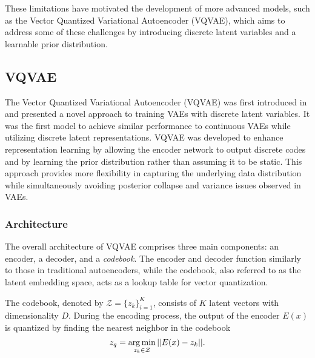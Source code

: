 \documentclass[../../thesis.tex]{subfiles}
\begin{document}
These limitations have motivated the development of more advanced models, such as the Vector Quantized Variational Autoencoder (VQVAE), which aims to address some of these challenges by introducing discrete latent variables and a learnable prior distribution.


\subsection{VQVAE}
The Vector Quantized Variational Autoencoder (VQVAE) was first introduced in \cite{VQVAE} and presented a novel approach to training VAEs with discrete latent variables. It was the first model to achieve similar performance to continuous VAEs while utilizing discrete latent representations. VQVAE was developed to enhance representation learning by allowing the encoder network to output discrete codes and by learning the prior distribution rather than assuming it to be static. This approach provides more flexibility in capturing the underlying data distribution while simultaneously avoiding posterior collapse and variance issues observed in VAEs.



\subsubsection{Architecture}

The overall architecture of VQVAE comprises three main components: an encoder, a decoder, and a \textit{codebook}. The encoder and decoder function similarly to those in traditional autoencoders, while the codebook, also referred to as the latent embedding space, acts as a lookup table for vector quantization.\newline

The codebook, denoted by $\mathcal{Z} = \{z_k\}_{i=1}^K$, consists of $K$ latent vectors with dimensionality $D$. During the encoding process, the output of the encoder $E(x)$ is quantized by finding the nearest neighbor in the codebook
\begin{equation}
    z_q = \operatorname*{arg\,min}_{z_k\in\mathcal{Z}} ||E(x)-z_k||.
\end{equation}
\end{document}
